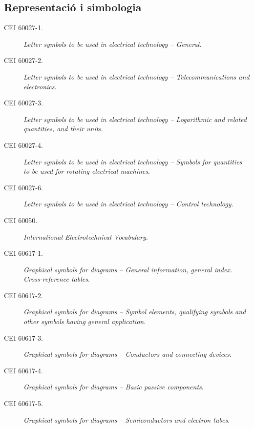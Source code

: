 \subsection*{Representació i simbologia}
\begin{description}
    \item [\hspace{5mm}CEI 60027-1.] \textit{Letter symbols to be used in electrical technology -- General}.
    \item [\hspace{5mm}CEI 60027-2.] \textit{Letter symbols to be used in electrical technology -- Telecommunications and electronics}.
    \item [\hspace{5mm}CEI 60027-3.] \textit{Letter symbols to be used in electrical technology -- Logarithmic and related quantities, and their units}.
    \item [\hspace{5mm}CEI 60027-4.] \textit{Letter symbols to be used in electrical technology -- Symbols for quantities to be used for rotating electrical machines}.
    \item [\hspace{5mm}CEI 60027-6.] \textit{Letter symbols to be used in electrical technology -- Control technology}.
    \item [\hspace{5mm}CEI 60050.] \textit{International Electrotechnical Vocabulary}. 
    \item [\hspace{5mm}CEI 60617-1.] \textit{Graphical symbols for diagrams -- General information, general index. Cross-reference tables}.
    \item [\hspace{5mm}CEI 60617-2.] \textit{Graphical symbols for diagrams -- Symbol elements, qualifying symbols and other symbols having general application}.
    \item [\hspace{5mm}CEI 60617-3.] \textit{Graphical symbols for diagrams -- Conductors and connecting devices}.
    \item [\hspace{5mm}CEI 60617-4.] \textit{Graphical symbols for diagrams -- Basic passive components}.
    \item [\hspace{5mm}CEI 60617-5.] \textit{Graphical symbols for diagrams -- Semiconductors and electron tubes}.

\end{description}
